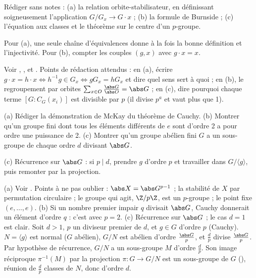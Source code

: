 \begin{exo}
Rédiger sans notes : (a) la relation orbite-stabilisateur, en définissant soigneusement l'application $G/G_x\to G\cdot x$ ; (b) la formule de Burnside ; (c) l'équation aux classes et le théorème sur le centre d'un $p$-groupe.
\begin{indication}
Pour (a), une seule chaîne d'équivalences donne à la fois la bonne définition et l'injectivité. Pour (b), compter les couples $(g,x)$ avec $g\cdot x=x$.
\end{indication}
\begin{corrige}
Voir , ,  et . Points de rédaction attendus : en (a), écrire $g\cdot x=h\cdot x\iff h^{-1}g\in G_x\iff gG_x=hG_x$ et dire quel sens sert à quoi ; en (b), le regroupement par orbites $\sum_{x\in O}\frac{\abs G}{\abs O}=\abs G$ ; en (c), dire pourquoi chaque terme $[G:C_G(x_i)]$ est divisible par $p$ (il divise $p^a$ et vaut plus que 1).
\end{corrige}
\end{exo}

\begin{exo}\label{exo-cauchy}
(a) Rédiger la démonstration de McKay du théorème de Cauchy. (b) Montrer qu'un groupe fini dont tous les éléments différents de $e$ sont d'ordre 2 a pour ordre une puissance de 2. (c) Montrer qu'un groupe abélien fini $G$ a un sous-groupe de chaque ordre $d$ divisant $\abs G$.
\begin{indication}
(c) Récurrence sur $\abs G$ : si $p\mid d$, prendre $g$ d'ordre $p$ et travailler dans $G/\langle g\rangle$, puis remonter par la projection.
\end{indication}
\begin{corrige}
(a) Voir . Points à ne pas oublier : $\abs X=\abs G^{p-1}$ ; la stabilité de $X$ par permutation circulaire ; le groupe qui agit, $\Z/p\Z$, est un $p$-groupe ; le point fixe $(e,\dots,e)$.
(b) Si un nombre premier impair $q$ divisait $\abs G$, Cauchy donnerait un élément d'ordre $q$ : c'est  avec $p=2$.
(c) Récurrence sur $\abs G$ ; le cas $d=1$ est clair. Soit $d>1$, $p$ un diviseur premier de $d$, et $g\in G$ d'ordre $p$ (Cauchy). $N=\langle g\rangle$ est normal ($G$ abélien), $G/N$ est abélien d'ordre $\frac{\abs G}p$, et $\frac dp$ divise $\frac{\abs G}p$. Par hypothèse de récurrence, $G/N$ a un sous-groupe $M$ d'ordre $\frac dp$. Son image réciproque $\pi^{-1}(M)$ par la projection $\pi:G\to G/N$ est un sous-groupe de $G$ (), réunion de $\frac dp$ classes de $N$, donc d'ordre $d$.
\end{corrige}
\end{exo}


